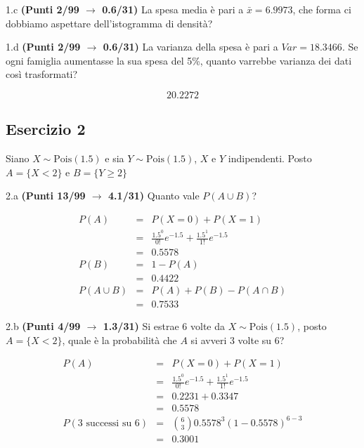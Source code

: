 \documentclass[
  11pt,
]{book}
\theoremstyle{mytheoremstyle}
\theoremstyle{mydefstyle}
\newenvironment{sol}
  {
  \begin{tcolorbox}[enhanced,breakable,arc=0.1mm,boxrule=1pt,colback=white,colframe=iblue,
  title=\bf \fontfamily{lmss}\selectfont \hspace{.5 cm} Soluzione,drop fuzzy shadow]

}{
\end{tcolorbox}
  }
\begin{document}
1.c \textbf{(Punti 2/99 \(\rightarrow\) 0.6/31)} La spesa media è pari a \(\bar x=6.9973\), che forma ci dobbiamo aspettare dell'istogramma di densità?

1.d \textbf{(Punti 2/99 \(\rightarrow\) 0.6/31)} La varianza della spesa è pari a \(Var=18.3466\).
Se ogni famiglia aumentasse la sua spesa del 5\%, quanto varrebbe varianza dei dati così trasformati?

\begin{sol}
\[20.2272\]

\end{sol}

\subsection{Esercizio 2}\label{esercizio-2-11}

Siano \(X\sim \text{Pois}(1.5)\) e sia \(Y\sim \text{Pois}(1.5)\), \(X\) e \(Y\) indipendenti. Posto \(A=\{X<2\}\) e \(B=\{Y\ge 2\}\)

2.a \textbf{(Punti 13/99 \(\rightarrow\) 4.1/31)} Quanto vale \(P(A\cup B)\)?

\begin{sol}
\begin{eqnarray*}
  P(A) &=&  P(X=0)+P(X=1)\\
  &=& \frac{1.5^0}{0!}e^{-1.5}+\frac{1.5^1}{1!}e^{-1.5}\\
  &=& 0.5578\\
  P(B) &=& 1-P(A)\\
  &=&0.4422\\
  P(A\cup B) &=& P(A)+P(B)-P(A\cap B)\\
  &=& 0.7533
\end{eqnarray*}

\end{sol}

2.b \textbf{(Punti 4/99 \(\rightarrow\) 1.3/31)} Si estrae 6 volte da \(X\sim \text{Pois}(1.5)\), posto \(A=\{X<2\}\), quale è la probabilità che \(A\) si avveri 3 volte su 6?

\begin{sol}
\begin{eqnarray*}
  P(A) &=&  P(X=0)+P(X=1)\\
  &=& \frac{1.5^0}{0!}e^{-1.5}+\frac{1.5^1}{1!}e^{-1.5}\\
  &=& 0.2231+0.3347\\
  &=& 0.5578\\
  P(\text{3 successi su 6}) &=& \binom{6}{3}0.5578^3(1-0.5578)^{6-3}\\
  &=&0.3001
\end{eqnarray*}

\end{sol}
\end{document}
